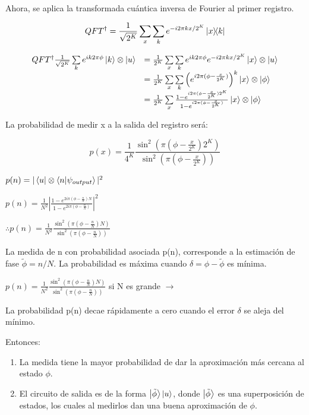 Ahora, se aplica la transformada cuántica inversa de Fourier al primer registro.

\begin{equation}
    QFT^\dagger = \frac{1}{\sqrt{2^K}} \sum\limits_x\sum\limits_k e^{-i 2\pi k x / 2^K} \ketbra{x}{k}
\end{equation}

\begin{equation}
\begin{array}{r l}
    QFT^\dagger \frac{1}{\sqrt{2^K}} \sum\limits_k e^{i k 2\pi \phi} \ket{k} \otimes \ket{u} &= \frac{1}{2^K} \sum\limits_x \sum\limits_k e^{i k 2\pi \phi} e^{-i 2\pi k x / 2^K} \ket{x} \otimes \ket{u} \\
    &= \frac{1}{2^K} \sum\limits_x\sum\limits_k \left(e^{i 2\pi (\phi - \frac{x}{2^K})}\right)^k \ket{x} \otimes \ket{\phi} \\
    &= \frac{1}{2^K} \sum\limits_x \frac{1 - e^{i 2\pi (\phi - \frac{x}{2^K}) 2^K}}{1 - e^{i 2\pi (\phi - \frac{x}{2^K})}} \ket{x} \otimes \ket{\phi} \\
\end{array}
\end{equation}

La probabilidad de medir x a la salida del registro será:

\begin{equation}
    p(x) = \frac{1}{4^{K}} \frac{\sin^2(\pi (\phi - \frac{x}{2^K}) 2^K)}{\sin^2(\pi (\phi - \frac{x}{2^K}))}
\end{equation}

$p(n) = |\bra{u} \otimes \bra{n} \ket{\psi_{output}}|^2$

$p(n) = \frac{1}{N^2} |\frac{1 - e^{2 i \pi (\phi - \frac{n}{N})N}}{1 - e^{2 i \pi (\phi - \frac{n}{N})}}|^2$

$\therefore p(n) = \frac{1}{N^2} \frac{\sin^2(\pi (\phi - \frac{n}{N}) N)}{\sin^2(\pi (\phi - \frac{n}{N}))}$

La medida de n con probabilidad asociada p(n), corresponde a la estimación de fase $\tilde{\phi} = n/N$. La probabilidad es máxima cuando $\delta = \phi - \tilde{\phi}$ es mínima.

$p(n) = \frac{1}{N^2} \frac{\sin^2(\pi (\phi - \frac{n}{N}) N)}{\sin^2(\pi (\phi - \frac{n}{N}))}$ si N es grande $\rightarrow$ %

La probabilidad p(n) decae rápidamente a cero cuando el error $\delta$ se aleja del mínimo.

Entonces:

\begin{enumerate}
    \item La medida tiene la mayor probabilidad de dar la aproximación más cercana al estado $\phi$.
    \item El circuito de salida es de la forma $\ket{\tilde{\phi}} \ket{u}$, donde $\ket{\tilde{\phi}}$ es una superposición de estados, los cuales al medirlos dan una buena aproximación de $\phi$.
\end{enumerate}

